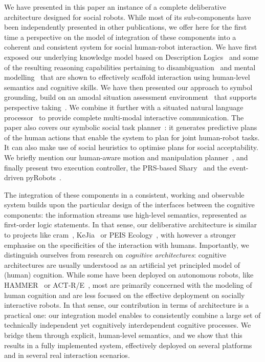 \documentclass[preprint,3p,times]{elsarticle}
\begin{document}
We have presented in this paper an instance of a complete deliberative architecture designed for
social robots. While most of its sub-components have been independently
presented in other publications, we offer here for the first time a perspective
on the model of integration of these components into a coherent and consistent
system for social human-robot interaction. We have first exposed our underlying
knowledge model based on Description Logics~\cite{Lemaignan2010} and some of the
resulting reasoning capabilities pertaining to disambiguation~\cite{Ros2010b}
and mental modelling~\cite{warnier2012when} that are shown to effectively
scaffold interaction using human-level semantics and cognitive skills. We have
then presented our approach to symbol grounding, build on an amodal situation
assessment environment~\cite{Sisbot2011} that supports perspective
taking~\cite{Marin2008,Ros2010}. We combine it further with a situated natural
language processor~\cite{Lemaignan2011a} to provide complete multi-modal
interactive communication.  The paper also covers our symbolic social task
planner~\cite{Alili2008, Alili2009, Lallement2014}: it generates predictive
plans of the human actions that enable the system to plan for joint human-robot
tasks. It can also make use of social heuristics to optimise plans for social
acceptability. We briefly mention our human-aware motion and manipulation
planner~\cite{Sisbot2007,Sisbot2008,Mainprice2011,Pandey2011,sisbot2012human,kruse2013human}, and finally present two
execution controller, the PRS-based {\sc
Shary}~\cite{clodic2009,fiore2014,clodic2014key}
and the event-driven {\sc pyRobots}~\cite{lemaignan2015pyrobots}.

The integration of these components in a consistent, working and observable
system builds upon the particular design of the interfaces between the cognitive
components: the information streams use high-level semantics, represented as
first-order logic statements. In that sense, our deliberative architecture is
similar to projects like {\sc cram}~\cite{Beetz2010}, KeJia~\cite{Chen2010} or
PEIS Ecology~\cite{saffiotti2005peis, daoutis2012cooperative}, with however a
stronger emphasise on the specificities of the interaction with humans.
Importantly, we
distinguish ourselves from research on \emph{cognitive architectures}: cognitive
architectures are usually understood as an artificial yet principled model of
(human) cognition. While some have been deployed on autonomous robots, like
HAMMER~\cite{demiris2006hierarchical} or ACT-R/E~\cite{trafton2013act}, most are
primarily concerned with the modeling of human cognition and are less focused on
the effective deployment on socially interactive robots.
In that sense, our contribution in terms of architecture is a practical one:
our integration model enables to consistently combine a large set of
technically independent yet cognitively interdependent cognitive processes. We
bridge them through explicit, human-level semantics, and we show that this
results in a fully implemented system, effectively deployed on several
platforms and in several real interaction scenarios.
\end{document}

